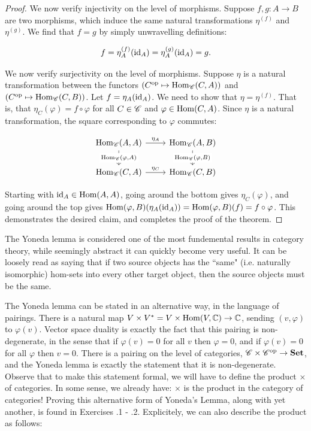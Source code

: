 \documentclass{article}
\theoremstyle{definition}
\numberwithin{figure}{section}
\begin{document}
\begin{proof}
We now verify injectivity on the level of morphisms. Suppose $f,g: A\to B$ are two morphisms, which induce the same natural transformations $\eta^{(f)}$ and $\eta^{(g)}$. We find that $f=g$ by simply unwravelling definitions:

$$f=\eta^{(f)}_{A}(\mathrm{id}_A)=\eta^{(g)}_{A}(\mathrm{id}_A)=g.$$

We now verify surjectivity on the level of morphisms. Suppose $\eta$ is a natural transformation between the functors $\left(C^{\mathrm{op}}\mapsto \mathrm{Hom}_{\mathscr{C}}(C,A)\right)$ and $\left(C^{\mathrm{op}}\mapsto \mathrm{Hom}_{\mathscr{C}}(C,B)\right)$. Let $f=\eta_A(\mathrm{id}_A)$. We need to show that $\eta=\eta^{(f)}$. That is, that $\eta_C(\varphi)=f\circ \varphi$ for all $C\in \mathscr{C}$ and $\varphi \in \mathrm{Hom}(C,A)$. Since $\eta$ is a natural transformation, the square corresponding to $\varphi$ commutes:

\[\begin{tikzcd}
	{\Hom_{\Ccat}(A,A)} & {\Hom_{\Ccat}(A,B)} \\
	{\Hom_{\Ccat}(C,A)} & {\Hom_{\Ccat}(C,B)}
	\arrow["{\eta_{C}}", from=2-1, to=2-2]
	\arrow["{\eta_{A}}", from=1-1, to=1-2]
	\arrow["{\Hom_{\Ccat}(\varphi,A)}"{description}, from=1-1, to=2-1]
	\arrow["{\Hom_{\Ccat}(\varphi,B)}"{description}, from=1-2, to=2-2]
\end{tikzcd}\]

Starting with $\mathrm{id}_A\in \mathrm{Hom}(A,A)$, going around the bottom gives $\eta_C(\varphi)$, and going around the top gives $\mathrm{Hom}(\varphi,B)(\eta_A(\mathrm{id}_A))=\mathrm{Hom}(\varphi,B)(f)=f\circ \varphi$. This demonstrates the desired claim, and completes the proof of the theorem.
\end{proof}

The Yoneda lemma is considered one of the most fundemental results in category theory, while seemingly abstract it can quickly become very useful. It can be loosely read as saying that if two source objects has the ``same" (i.e. naturally isomorphic) hom-sets into every other target object, then the source objects must be the same.


The Yoneda lemma can be stated in an alternative way, in the language of pairings. There is a natural map $V\times V^*=V\times \mathrm{Hom}(V,\mathbb{C})\to \mathbb{C}$, sending $(v,\varphi)$ to $\varphi(v)$. Vector space duality is exactly the fact that this pairing is non-degenerate, in the sense that if $\varphi(v)=0$ for all $v$ then $\varphi=0$, and if $\varphi(v)=0$ for all $\varphi$ then $v=0$. There is a pairing on the level of categories, $\mathscr{C} \times \mathscr{C}^{\mathrm{op}}\to \bold{Set}$, and the Yoneda lemma is exactly the statement that it is non-degenerate. Observe that to make this statement formal, we will have to define the product $\times$ of categories. In some sense, we already have: $\times$ is the product in the category of categories! Proving this alternative form of Yoneda's Lemma, along with yet another, is found in Exercises \thesection.1 - \thesection.2. Explicitely, we can also describe the product as follows:
\end{document}
